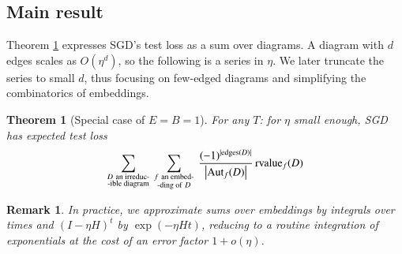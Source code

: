 \documentclass[final,12pt]{colt2021} %
\newtheorem{thm}{Theorem}
\newtheorem{rmk}{Remark}
\newcommand{\wabs}[1]{\left|#1\right|}
\newcommand{\Aut}{\text{\textnormal{Aut}}}
\newcommand{\rvalue}{\text{\textnormal{rvalue}}}
\newcommand{\edges}{\text{\textnormal{edges}}}
\begin{document}
        \subsection{Main result}
    
            Theorem \ref{thm:resum} expresses SGD's test loss as a sum over
            diagrams.  A diagram with $d$ edges scales as $O(\eta^d)$, so the
            following is a series in $\eta$.  We later truncate the series to small
            $d$, thus focusing on few-edged diagrams and simplifying the
            combinatorics of embeddings.
            \begin{thm}[Special case of $E=B=1$] \label{thm:resum}
                For any $T$: for $\eta$ small enough, SGD has expected test loss
                \begin{equation*} \label{eq:resum}
                    \sum_{\substack{D~\text{an irreduc-} \\ \text{-ible diagram}}}
                    ~
                    \sum_{\substack{f~\text{an embed-} \\ \text{-ding of}~D}}
                    ~
                    \frac{(-1)^{|\edges(D)|}}{\wabs{\Aut_f(D)}}
                    \,
                    {\rvalue_f}(D)
                \end{equation*}
            \end{thm}
    
     
            \begin{rmk} \label{rmk:integrate}
                In practice, we approximate sums over embeddings by integrals over
                times and $(I-\eta H)^t$ by $\exp(- \eta H t)$, reducing to a
                routine integration of exponentials at the cost of an error factor
                $1 + o(\eta)$.
            \end{rmk}
    
     
\end{document}
